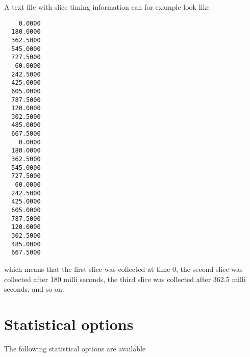A text file with slice timing information can for example look like
\begin{verbatim}
    0.0000
  180.0000
  362.5000
  545.0000
  727.5000
   60.0000
  242.5000
  425.0000
  605.0000
  787.5000
  120.0000
  302.5000
  485.0000
  667.5000
    0.0000
  180.0000
  362.5000
  545.0000
  727.5000
   60.0000
  242.5000
  425.0000
  605.0000
  787.5000
  120.0000
  302.5000
  485.0000
  667.5000
\end{verbatim}

which means that the first slice was collected at time 0, the second slice was collected after 180 milli seconds, the third slice was collected after 362.5 milli seconds, and so on.

\newpage


\section{Statistical options}

The following statistical options are available

